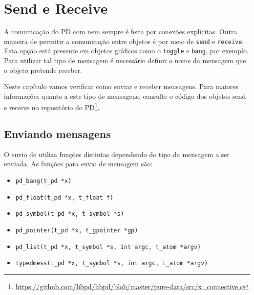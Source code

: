 \chapter{Send e Receive}


A comunicação do PD com \externals nem sempre é feita por conexões explícitas.
Outra maneira de permitir a comunicação entre objetos é por meio de \texttt{send} e
\texttt{receive}.
Esta opção está presente em objetos gráficos como o \texttt{toggle} e \texttt{bang}, por exemplo.
Para utilizar tal tipo de mensagem é necessário definir o nome da mensagem que
o objeto pretende receber.


Neste capítulo vamos verificar como enviar e receber mensagens.
Para maiores informações quanto a este tipo de mensagens, consulte o código dos
objetos send e receive no repositório do PD\footnote{
\url{https://github.com/libpd/libpd/blob/master/pure-data/src/x_connective.c}
}.

\section{Enviando mensagens}

O envio de utiliza funções distintas dependendo do tipo da mensagem a ser enviada.
As funções para envio de mensagem são:

\begin{itemize}
\item \texttt{pd\_bang(t\_pd *x)}
\item \texttt{pd\_float(t\_pd *x, t\_float f)}
\item \texttt{pd\_symbol(t\_pd *x, t\_symbol *s)}
\item \texttt{pd\_pointer(t\_pd *x, t\_gpointer *gp)}
\item \texttt{pd\_list(t\_pd *x, t\_symbol *s, int argc, t\_atom *argv)}
\item \texttt{typedmess(t\_pd *x, t\_symbol *s, int argc, t\_atom *argv)}
\end{itemize}


